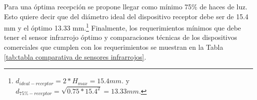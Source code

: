 Para una óptima recepción se propone llegar como mínimo 75\% de haces de luz. Esto quiere decir que del diámetro ideal del dispositivo receptor debe ser de 15.4 mm y el óptimo 13.33 mm.\footnote{$d_{ideal-receptor}=2*H_{max}=15.4 mm.$ y $d_{75\%-receptor}=\sqrt{0.75*15.4^2}=13.33 mm.$ } Finalmente, los requerimientos mínimos que debe tener el sensor infrarrojo óptimo y comparaciones técnicas de los dispositivos comerciales que cumplen con los requerimientos se muestran en la Tabla \ref{tab:tabla comparativa de sensores infrarrojos}.

